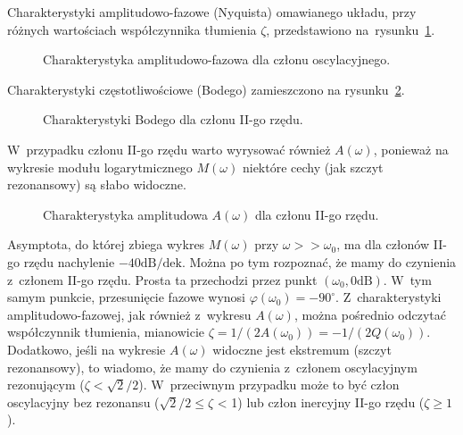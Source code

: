 \documentclass[paper=a4,DIV=12]{lpas}
\newcommand{\degree}{^{\circ}}
\begin{document}
\begin{appendices}
  Charakterystyki amplitudowo-fazowe (Nyquista) omawianego układu, przy różnych
  wartościach współczynnika tłumienia $\zeta$, przedstawiono
  na~rysunku~\ref{fig:3KG02}.
  \begin{figure}[H]
    \centering
    
    \caption{Charakterystyka amplitudowo-fazowa dla członu oscylacyjnego.}
    \label{fig:3KG02}
  \end{figure}

  Charakterystyki częstotliwościowe (Bodego) zamieszczono na rysunku~\ref{fig:O26C4}.
  \begin{figure}[H]
    \centering
    
    \caption{Charakterystyki Bodego dla członu II-go rzędu.}
    \label{fig:O26C4}
  \end{figure}
  W~przypadku członu II-go rzędu warto wyrysować również $A(\omega)$, ponieważ
  na wykresie modułu logarytmicznego $M(\omega)$ niektóre cechy (jak szczyt
  rezonansowy) są słabo widoczne.
  \begin{figure}[H]
    \centering
    
    \caption{Charakterystyka amplitudowa $A(\omega)$ dla członu II-go rzędu.}
    \label{eq:9LBEW}
  \end{figure}

  Asymptota, do której zbiega wykres $M(\omega)$ przy $\omega >> \omega_0$, ma
  dla członów II-go rzędu nachylenie $-40 \text{dB/dek}$. Można po tym
  rozpoznać, że mamy do czynienia z~członem II-go rzędu. Prosta ta przechodzi
  przez punkt $(\omega_0, 0\text{dB})$. W~tym samym punkcie, przesunięcie
  fazowe wynosi $\varphi(\omega_0) = -90\degree$. Z~charakterystyki
  amplitudowo-fazowej, jak również z~wykresu $A(\omega)$, można pośrednio
  odczytać współczynnik tłumienia, mianowicie
  $\zeta=1/(2A(\omega_0))=-1/(2Q(\omega_0))$. Dodatkowo, jeśli na wykresie
  $A(\omega)$ widoczne jest ekstremum (szczyt rezonansowy), to wiadomo, że mamy
  do czynienia z~członem oscylacyjnym rezonującym ($\zeta < \sqrt{2}/2$).
  W~przeciwnym przypadku może to być człon oscylacyjny bez rezonansu
  ($\sqrt{2}/2 \le \zeta$ < 1) lub człon inercyjny II-go rzędu ($\zeta \ge 1$).


\end{appendices}
\end{document}

